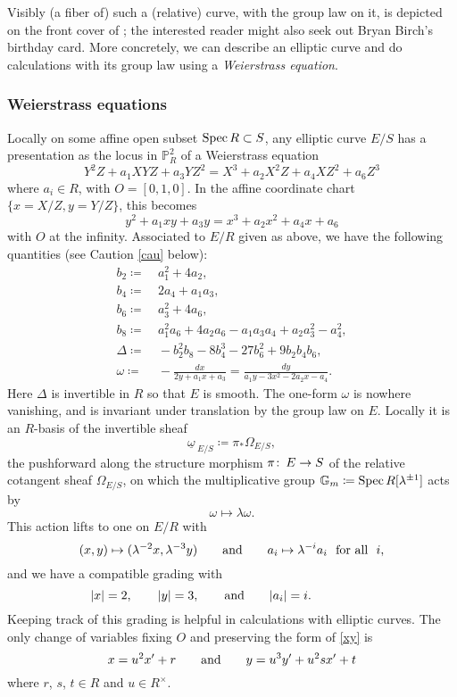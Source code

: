 \documentclass{gtpart}
\theoremstyle{definition}
\theoremstyle{remark}
\def\co{\colon\thinspace}
\newcommand{\mb}[1]{\mathbb{#1}}
\newcommand{\Spec}{{\rm Spec\thinspace}}
\newcommand{\Gm}{{{\mb G}_m}}
\newcommand{\BP}{{\mb P}}
\newcommand{\ad}{{\rm and}}
\newcommand{\om}{\underline{\omega\!}_{~E/S}}
\newcommand{\ce}{\coloneqq}
\numberwithin{equation}{section}
\numberwithin{thm}{section}
\begin{document}
Visibly (a fiber of) such a (relative) curve, with the group law on it, 
is depicted on the front cover of \cite[second ed.]{AEC}; the interested 
reader might also seek out Bryan Birch's birthday card.  More concretely, 
we can describe an elliptic curve and do calculations with its group law 
using a {\em Weierstrass equation}.  

\subsubsection*{Weierstrass equations}

Locally on some affine open subset $\Spec R \subset S$, any elliptic 
curve $E/S$ has a presentation as the locus in $\BP_R^2$ of a 
Weierstrass equation 
\begin{equation}
\label{XYZ}
 Y^2 Z + a_1 X Y Z + a_3 Y Z^2 = X^3 + a_2 X^2 Z + a_4 X Z^2 + a_6 Z^3 
\end{equation}
where $a_i \in R$, with $O = [0,1,0]$.  In the affine coordinate chart 
$\{x = X/Z, y = Y/Z\}$, this becomes 
\begin{equation}
\label{xy}
 y^2 + a_1 x y + a_3 y = x^3 + a_2 x^2 + a_4 x + a_6 
\end{equation}
with $O$ at the infinity.  Associated to $E/R$ given as above, we have 
the following quantities (see Caution \ref{cau} below): 
\begin{equation}
\label{quantities}
\begin{split}
 b_2 \ce & ~ a_1^2 + 4 a_2, \\
 b_4 \ce & ~ 2 a_4 + a_1 a_3, \\
 b_6 \ce & ~ a_3^2 + 4 a_6, \\
 b_8 \ce & ~ a_1^2 a_6 + 4 a_2 a_6 - a_1 a_3 a_4 + a_2 a_3^2 - a_4^2, \\
 \Delta \ce & ~ -b_2^2 b_8 - 8 b_4^3 - 27 b_6^2 + 9 b_2 b_4 b_6, \\
 \omega \ce & ~ -\frac{dx}{2 y + a_1 x + a_3} = \frac{dy}{a_1 y - 3 x^2 - 2 a_2 x - a_4}.  
\end{split}
\end{equation}
Here $\Delta$ is invertible in $R$ so that $E$ is smooth.  The one-form 
$\omega$ is nowhere vanishing, and is invariant under translation by the 
group law on $E$.  Locally it is an $R$-basis of the invertible sheaf 
\[
 \om \ce \pi_* \Omega_{E/S}, 
\]
the pushforward along the structure morphism $\pi \co E \to S$ of the 
relative cotangent sheaf $\Omega_{E/S}$, on which the multiplicative 
group $\Gm \ce \Spec R[\lambda^{\pm1}]$ acts by 
\begin{equation}
\label{action}
 \omega \longmapsto \lambda \omega.  
\end{equation}
This action lifts to one on $E/R$ with 
\[
 (x,y) \mapsto (\lambda^{-2} x,\lambda^{-3} y) \qquad \ad \qquad 
 a_i \mapsto \lambda^{-i} a_i \text{~ for all ~} i, 
\]
and we have a compatible grading with 
\[
 |x| = 2, \qquad |y| = 3, \qquad \ad \qquad |a_i| = i.  \qquad \qquad 
 \quad
\]
Keeping track of this grading is helpful in calculations with elliptic 
curves.  The only change of variables fixing $O$ and preserving the form 
of \eqref{xy} is 
\[
 x = u^2 x' + r \qquad \ad \qquad y = u^3 y' + u^2 s x' + t 
\]
where $r$, $s$, $t \in R$ and $u \in R^\times$.  
\end{document}
